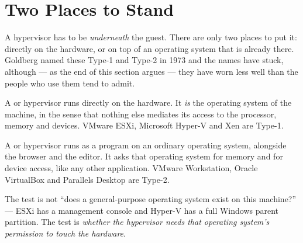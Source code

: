 \section{Two Places to Stand}

A hypervisor has to be \emph{underneath} the guest. There are only two places
to put it: directly on the hardware, or on top of an operating system that is
already there. Goldberg named these Type-1 and Type-2 in 1973 and the names
have stuck, although --- as the end of this section argues --- they have worn
less well than the people who use them tend to admit.

\begin{definitionbox}
A  or  hypervisor runs directly on the hardware.
It \emph{is} the operating system of the machine, in the sense that nothing
else mediates its access to the processor, memory and devices. VMware ESXi,
Microsoft Hyper-V and Xen are Type-1.

\smallskip
A  or  hypervisor runs as a program on an ordinary
operating system, alongside the browser and the editor. It asks that operating
system for memory and for device access, like any other application. VMware
Workstation, Oracle VirtualBox and Parallels Desktop are Type-2.

\smallskip
The test is not ``does a general-purpose operating system exist on this
machine?'' --- ESXi has a management console and Hyper-V has a full Windows
parent partition. The test is \emph{whether the hypervisor needs that operating
system's permission to touch the hardware}.
\end{definitionbox}

